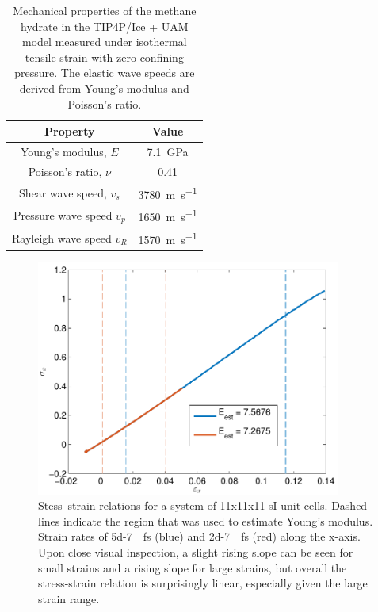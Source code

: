 \begin{table}
\centering
\caption{Mechanical properties of the methane hydrate in the TIP4P/Ice + UAM model measured under isothermal tensile strain with zero confining pressure. The elastic wave speeds are derived from Young's modulus and Poisson's ratio.}
\label{tbl:mechanical_from_simulation}
\begin{tabular}{c|c}
Property & Value \\
\hline
Young's modulus, $E$ & \SI{7.1}{\giga\pascal} \\
Poisson's ratio, $\nu$ & 0.41 \\
Shear wave speed, $v_s$ & \SI{3780}{\meter\per\second} \\
Pressure wave speed $v_p$ & \SI{1650}{\meter\per\second} \\
Rayleigh wave speed $v_R$ & \SI{1570}{\meter\per\second} \\
\end{tabular}
\end{table}

\begin{figure}
\centering
\includegraphics[width=10cm]{../figures/thesis/stress_strain_11_11_11_tip4p_ice_uam.pdf}
\caption{Stess--strain relations for a system of 11x11x11 sI unit cells. Dashed lines indicate the region that was used to estimate Young's modulus. Strain rates of \SI{5d-7}{\per\femto\second} (blue) and \SI{2d-7}{\per\femto\second} (red) along the x-axis. Upon close visual inspection, a slight rising slope can be seen for small strains and a rising slope for large strains, but overall the stress-strain relation is surprisingly linear, especially given the large strain 	range.}
\label{fig:stress_strain_11_11_11_tip4p_ice_uam}

\end{figure}

